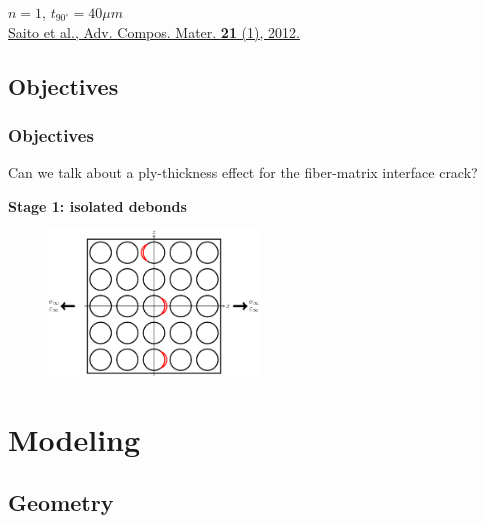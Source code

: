 \documentclass[first,firstsupp,lastsupp,last,hyperref,table]{ETHclass}
\begin{document}
\begin{frame}
\begin{figure}
\end{figure}
\vspace{-0.25cm}
$n=1$, $t_{90^{\circ}}=40\mu m$\\\vspace{5pt}
\pgfmathsetmacro{}
\pgfmathsetmacro{}
{\fontsize{\fontsizeref}{\stretchref} \selectfont \href{https://doi.org/10.1163/156855112X629522}{Saito et al., Adv. Compos. Mater. \textbf{21} (1), 2012.}}
\end{frame}

\subsection{Objectives}

\begin{frame}
\frametitle{\vspace{0.2cm}\small Objectives}
\vspace{-0.5cm}
Can we talk about a ply-thickness effect for the fiber-matrix interface crack?
\centering
\begin{alertblock}{\centering\scriptsize\bf Stage 1: isolated debonds}
\vspace{-0.25cm}
\begin{figure}
\centering
\includegraphics[width=0.5\textwidth]{stage1-isolateddebonds.pdf}
\end{figure}
\end{alertblock}
\end{frame}

\section{Modeling}

\subsection{Geometry}
\end{document}
